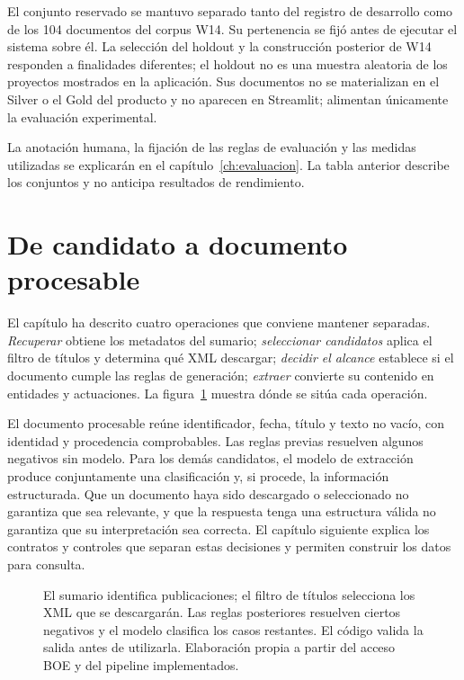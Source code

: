 El conjunto reservado se mantuvo separado tanto del registro de desarrollo
como de los 104 documentos del corpus W14. Su pertenencia se fijó antes de
ejecutar el sistema sobre él. La selección del holdout y la construcción
posterior de W14 responden a finalidades diferentes; el holdout no es una
muestra aleatoria de los proyectos mostrados en la aplicación. Sus documentos
no se materializan en el Silver o el Gold del producto y no aparecen en
Streamlit; alimentan únicamente la evaluación experimental.

La anotación humana, la fijación de las reglas de evaluación y las medidas
utilizadas se explicarán en el capítulo~\ref{ch:evaluacion}. La tabla anterior
describe los conjuntos y no anticipa resultados de rendimiento.

\section{De candidato a documento procesable}
El capítulo ha descrito cuatro operaciones que conviene mantener separadas.
\emph{Recuperar} obtiene los metadatos del sumario; \emph{seleccionar candidatos}
aplica el filtro de títulos y determina qué XML descargar; \emph{decidir el
alcance} establece si el documento cumple las reglas de generación;
\emph{extraer} convierte su contenido en entidades y actuaciones.
La figura~\ref{fig:api-corpus} muestra dónde se sitúa cada operación.

El documento procesable reúne identificador, fecha, título y texto no vacío,
con identidad y procedencia comprobables. Las reglas previas resuelven algunos
negativos sin modelo. Para los demás candidatos, el modelo de extracción
produce conjuntamente
una clasificación y, si procede, la información estructurada. Que un documento
haya sido descargado o seleccionado no garantiza que sea relevante, y que la
respuesta tenga una estructura válida no garantiza que su interpretación sea
correcta. El capítulo siguiente explica los contratos y controles que separan
estas decisiones y permiten construir los datos para consulta.

\begin{figure}[p]
\centering

\caption[API del BOE y construcción del corpus]{El sumario identifica
publicaciones; el filtro de títulos selecciona los XML que se descargarán.
Las reglas posteriores resuelven ciertos negativos y el modelo clasifica los
casos restantes. El código valida la salida antes de utilizarla. Elaboración propia
a partir del acceso BOE y del pipeline implementados.}
\label{fig:api-corpus}
\end{figure}
